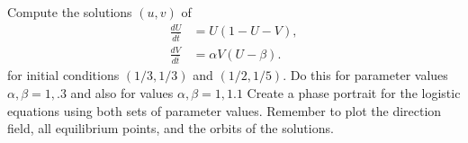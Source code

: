 \begin{problem}
	Compute the solutions $(u,v)$ of 
	\begin{align*}
		\frac{dU}{d\bar{t}} &= U(1-U-V),\\
		\frac{dV}{d\bar{t}} &= \alpha V (U-\beta).
	\end{align*}
	for initial conditions $(1/3, 1/3)$ and $(1/2, 1/5)$. Do this for parameter 
	values $\alpha, \beta = 1, .3$ and also for values $\alpha, \beta = 1, 1.1$
	Create a phase portrait for the logistic equations using both sets of parameter
	values. Remember to plot the direction field, all equilibrium points, and the orbits
	of the solutions.
\end{problem}